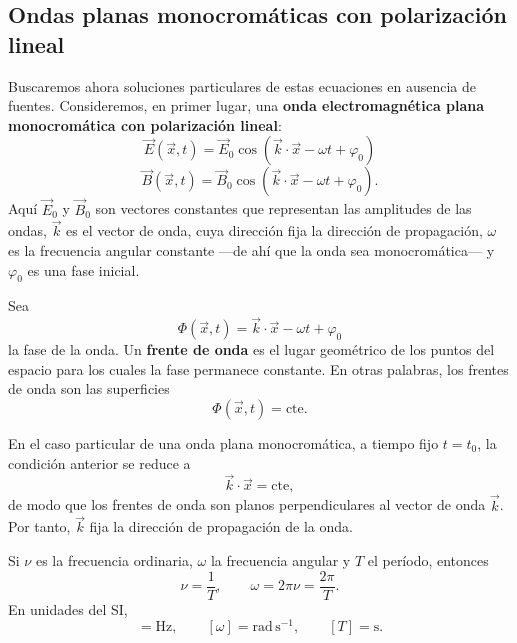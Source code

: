 \documentclass[12pt,a4paper]{article}
\theoremstyle{definition}
\theoremstyle{plain}
\numberwithin{equation}{section}
\theoremstyle{remark}
\newcommand{\E}{\vec{E}}
\newcommand{\B}{\vec{B}}
\begin{document}
\subsection{Ondas planas monocromáticas con polarización lineal}

Buscaremos ahora soluciones particulares de estas ecuaciones en ausencia de fuentes. Consideremos, en primer lugar, una \textbf{onda electromagnética plana monocromática con polarización lineal}:
\begin{equation*}
    \E(\vec x,t)= \vec E_0\cos\left(\vec k\cdot \vec x -\omega t+\varphi_0\right)
\end{equation*}
\begin{equation*}
    \B(\vec x,t)= \vec B_0\cos\left(\vec k\cdot \vec x -\omega t+\varphi_0\right).
\end{equation*}
Aquí $\vec E_0$ y $\vec B_0$ son vectores constantes que representan las amplitudes de las ondas, $\vec k$ es el vector de onda, cuya dirección fija la dirección de propagación, $\omega$ es la frecuencia angular constante ---de ahí que la onda sea monocromática--- y $\varphi_0$ es una fase inicial.



Sea
\begin{equation*}
    \Phi(\vec x,t)=\vec k\cdot \vec x-\omega t+\varphi_0
\end{equation*}
la fase de la onda. Un \textbf{frente de onda} es el lugar geométrico de los puntos del espacio para los cuales la fase permanece constante. En otras palabras, los frentes de onda son las superficies
\begin{equation*}
    \Phi(\vec x,t)=\text{cte}.
\end{equation*}

En el caso particular de una onda plana monocromática, a tiempo fijo $t=t_0$, la condición anterior se reduce a
\begin{equation*}
    \vec k\cdot \vec x=\text{cte},
\end{equation*}
de modo que los frentes de onda son planos perpendiculares al vector de onda $\vec k$. Por tanto, $\vec k$ fija la dirección de propagación de la onda.

Si $\nu$ es la frecuencia ordinaria, $\omega$ la frecuencia angular y $T$ el período, entonces
\begin{equation*}
    \nu=\frac{1}{T},
    \qquad
    \omega=2\pi \nu=\frac{2\pi}{T}.
\end{equation*}
En unidades del SI,
\begin{equation*}
    [\nu]=\mathrm{Hz},
    \qquad
    [\omega]=\mathrm{rad\,s^{-1}},
    \qquad
    [T]=\mathrm{s}.
\end{equation*}
\end{document}
